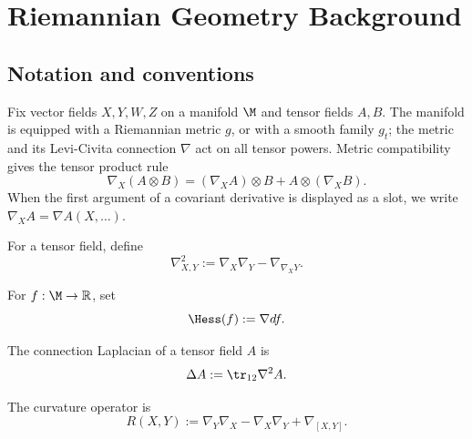 \chapter{Riemannian Geometry Background}

\section{Notation and conventions}

Fix vector fields $X,Y,W,Z$ on a manifold $\M$ and tensor fields $A,B$. The
manifold is equipped with a Riemannian metric $g$, or with a smooth family
$g_t$; the metric and its Levi-Civita connection $\nabla$ act on all tensor
powers. Metric compatibility gives the tensor product rule
\[
\nabla_X(A\otimes B)=(\nabla_XA)\otimes B+A\otimes(\nabla_XB).
\]
When the first argument of a covariant derivative is displayed as a slot, we
write $\nabla_XA=\nabla A(X,\ldots)$.

\begin{definition}
\label{topping:notn-second-covariant-derivative}


For a tensor field, define
\[
\nabla^2_{X,Y}:=\nabla_X\nabla_Y-\nabla_{\nabla_XY}.
\]
\end{definition}

\begin{definition}[Hessian]
\label{topping:notn-hessian}


For $f:\M\to\mathbb{R}$, set
\[
\Hess(f):=\nabla df.
\]
\end{definition}

\begin{definition}
\label{topping:notn-rough-laplacian}


The connection Laplacian of a tensor field $A$ is
\[
\Delta A:=\tr_{12}\nabla^2A.
\]
\end{definition}

\begin{definition}
\label{topping:notn-curvature-operator}


The curvature operator is
\[
R(X,Y):=\nabla_Y\nabla_X-\nabla_X\nabla_Y+\nabla_{[X,Y]}.
\]
\end{definition}

